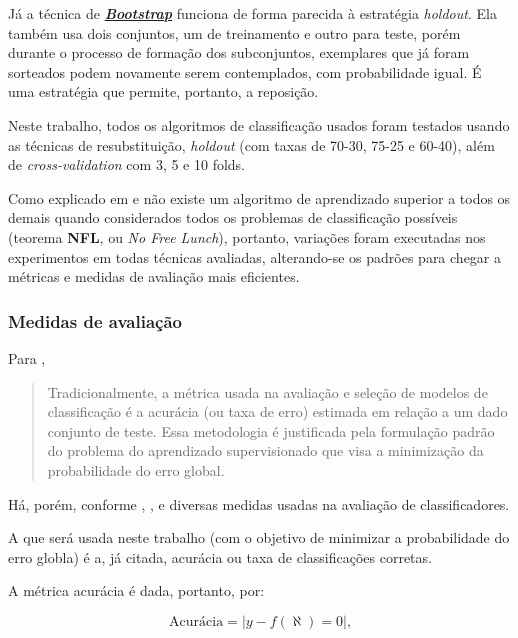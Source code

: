 Já a técnica de \textit{\textbf{\underline{Bootstrap}}} funciona de forma  parecida à estratégia \textit{holdout}. Ela também usa dois conjuntos, um de treinamento e outro para teste, porém durante o processo de formação dos subconjuntos, exemplares que já foram sorteados podem novamente serem contemplados, com probabilidade igual. É uma estratégia que permite, portanto, a reposição.

Neste trabalho, todos os algoritmos de classificação usados foram testados usando as técnicas de resubstituição, \textit{holdout} (com taxas de 70-30, 75-25 e 60-40), além de \textit{cross-validation} com 3, 5 e 10 folds. 

Como explicado em \cite{WolpertMacready} e \cite{Wolpert:1996} não existe um algoritmo de aprendizado superior a todos os demais quando considerados todos os problemas de classificação possíveis (teorema \textbf{NFL}, ou \textit{No Free Lunch}), portanto, variações foram executadas nos experimentos em todas técnicas avaliadas, alterando-se os padrões para chegar a métricas e medidas de avaliação mais eficientes.

\subsubsection{Medidas de avaliação}\label{medidas_avaliacao}

Para \cite{castro_supervised_2011}, \begin{quote}
	Tradicionalmente, a métrica usada na avaliação e seleção de modelos de classificação é a acurácia (ou taxa de erro) estimada em relação a um dado conjunto de teste. Essa metodologia é justificada pela formulação padrão do problema do aprendizado supervisionado que visa a minimização da probabilidade do erro global. 
\end{quote}

Há, porém, conforme \cite{Boscarioli2017}, \cite{aprenda_mineracao_fernando_amaral16}, \cite{classification2013} e \cite{classification_survey2012} diversas medidas usadas na avaliação de classificadores. 

A que será usada neste trabalho (com o objetivo de minimizar a probabilidade do erro globla) é a, já citada, acurácia ou taxa de classificações corretas. 

A métrica acurácia é dada, portanto, por:

\begin{equation}\label{acuracia}
\text{Acurácia} = |y-f(\aleph)=0|\text{,}
\end{equation}


